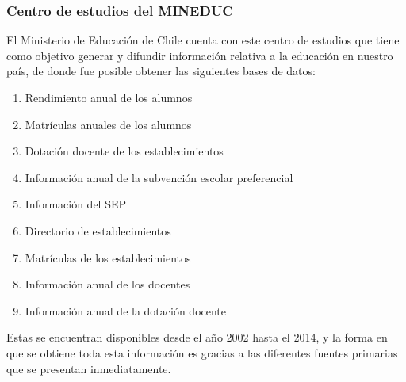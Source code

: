 \subsubsection{Centro de estudios del MINEDUC}
El Ministerio de Educación de Chile cuenta con este centro de estudios que tiene como objetivo generar y difundir información relativa a la educación en nuestro país, de donde fue posible obtener las siguientes bases de datos:
\begin{enumerate}
\item Rendimiento anual de los alumnos
\item Matrículas anuales de los alumnos
\item Dotación docente de los establecimientos
\item Información anual de la subvención escolar preferencial
\item Información del SEP
\item Directorio de establecimientos
\item Matrículas de los establecimientos
\item Información anual de los docentes
\item Información anual de la dotación docente
\end{enumerate}

Estas se encuentran disponibles desde el año 2002 hasta el 2014, y la forma en que se obtiene toda esta información es gracias a las diferentes fuentes primarias que se presentan inmediatamente. 

